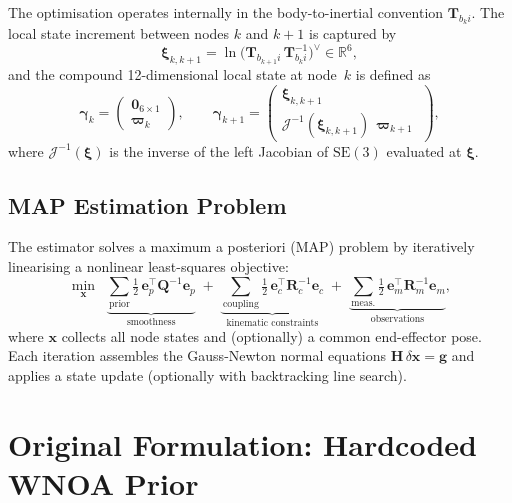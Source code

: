 \documentclass[11pt,a4paper]{article}
\newcommand{\SE}{\mathrm{SE}(3)}
\newcommand{\Jac}{\mathcal{J}}
\newcommand{\R}{\mathbb{R}}
\newcommand{\inv}{^{-1}}
\newcommand{\T}{\mathbf{T}}
\newcommand{\bxi}{\bm{\xi}}
\newcommand{\bvarpi}{\bm{\varpi}}
\newcommand{\bgamma}{\bm{\gamma}}
\newcommand{\be}{\mathbf{e}}
\newcommand{\bQ}{\mathbf{Q}}
\newcommand{\bzero}{\mathbf{0}}
\begin{document}
The optimisation operates internally in the body-to-inertial convention $\T_{b_k i}$.
The local state increment between nodes $k$ and $k{+}1$ is captured by
\begin{equation}
    \bxi_{k,k+1} = \ln\!\bigl(\T_{b_{k+1} i}\,\T_{b_k i}\inv\bigr)^\vee \in \R^6,
\end{equation}
and the compound 12-dimensional local state at node~$k$ is defined as
\begin{equation}
    \bgamma_k = \begin{pmatrix} \bzero_{6\times 1} \\ \bvarpi_k \end{pmatrix}, \qquad
    \bgamma_{k+1} = \begin{pmatrix} \bxi_{k,k+1} \\ \Jac\inv(\bxi_{k,k+1})\,\bvarpi_{k+1} \end{pmatrix},
\end{equation}
where $\Jac\inv(\bxi)$ is the inverse of the left Jacobian of $\SE$ evaluated at $\bxi$.

\subsection{MAP Estimation Problem}
The estimator solves a maximum a posteriori (MAP) problem by iteratively linearising a nonlinear least-squares objective:
\begin{equation}
    \min_{\mathbf{x}} \;\; \underbrace{\sum_{\text{prior}} \tfrac{1}{2}\,\be_p^\top \bQ\inv \be_p}_{\text{smoothness}} \;+\; \underbrace{\sum_{\text{coupling}} \tfrac{1}{2}\,\be_c^\top \mathbf{R}_c\inv \be_c}_{\text{kinematic constraints}} \;+\; \underbrace{\sum_{\text{meas.}} \tfrac{1}{2}\,\be_m^\top \mathbf{R}_m\inv \be_m}_{\text{observations}},
    \label{eq:map}
\end{equation}
where $\mathbf{x}$ collects all node states and (optionally) a common end-effector pose.
Each iteration assembles the Gauss-Newton normal equations
$\mathbf{H}\,\delta\mathbf{x} = \mathbf{g}$
and applies a state update (optionally with backtracking line search).

\section{Original Formulation: Hardcoded WNOA Prior}
\label{sec:original}
\end{document}

